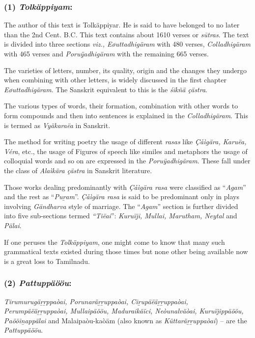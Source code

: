 \subsubsection*{(1) \textit{Tolkäppiyam}:}

The author of this text is Tolkäppiyar. He is said to have belonged to no later than the 2nd Cent. B.C. This text contains about 1610 verses or \textit{sūtras}. The text is divided into three sections \textit{viz., Eøuttadhigäram} with 480 verses, \textit{Colladhigäram} with 465 verses and \textit{Poruÿadhigäram} with the remaining 665 verses.

The varieties of letters, number, its quality, origin and the changes they undergo when combining with other letters, is widely discussed in the first chapter \textit{Eøuttadhigäram}. The Sanskrit equivalent to this is the \textit{śikñä çästra}.

The various types of words, their formation, combination with other words to form compounds and then into sentences is explained in the \textit{Colladhigäram}. This is termed as \textit{Vyäkaraëa} in Sanskrit.

The method for writing poetry the usage of different \textit{rasas} like \textit{Çåìgära, Karuëa, Véra}, etc., the usage of Figures of speech like similes and metaphors the usage of colloquial words and so on are expressed in the \textit{Poruÿadhigäram}. These fall under the class of \textit{Alaìkära çästra} in Sanskrit literature.

Those works dealing predominantly with \textit{Çåìgära rasa} were classified as “\textit{Agam}” and the rest as “\textit{Puṟam}”. \textit{Çåìgära rasa} is said to be predominant only in plays involving \textit{Gändharva} style of marriage. The “\textit{Agam}” section is further divided into five sub-sections termed \textit{“Tiëai}”: \textit{Kuruïji, Mullai, Marutham, Neytal} and \textit{Pälai}.

If one peruses the \textit{Tolkäppiyam}, one might come to know that many such grammatical texts existed during those times but none other being available now is a great loss to Tamilnadu.


\subsubsection*{(2) \textit{Pattuppäööu}:}

\textit{Tirumurugäṟṟppaòai, Porunaräṟṟuppaòai, Ciṟupäëäṟṟuppaòai, Perumpäëäṟṟuppaòai, Mullaipäööu, Maduraikäïci, Neòunalväòai, Kuruïjippäööu, Paööiṉappälai} and Malaipaòu-kaòäm (also known as \textit{Küttaräṟṟuppaòai}) – are the \textit{Pattuppäööu}.

